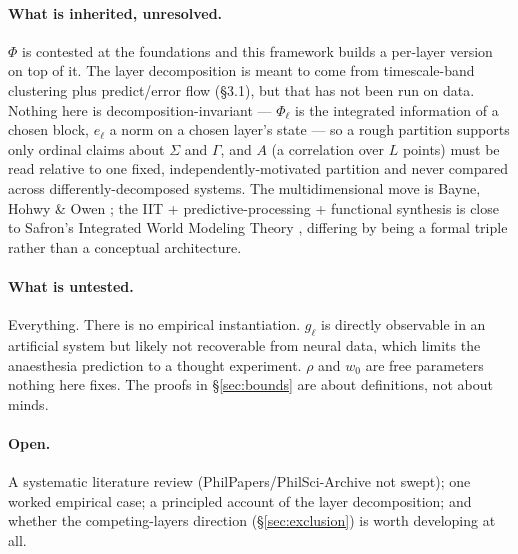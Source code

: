 \documentclass[11pt]{article}
\begin{document}
\paragraph{What is inherited, unresolved.} $\Phi$ is contested at the foundations \cite{barrett2019,hanson2023} and this framework builds a per-layer version on top of it. The layer decomposition is meant to come from timescale-band clustering plus predict/error flow (\S3.1), but that has not been run on data. Nothing here is decomposition-invariant --- $\Phi_\ell$ is the integrated information of a chosen block, $e_\ell$ a norm on a chosen layer's state --- so a rough partition supports only ordinal claims about $\Sigma$ and $\Gamma$, and $A$ (a correlation over $L$ points) must be read relative to one fixed, independently-motivated partition and never compared across differently-decomposed systems. The multidimensional move is Bayne, Hohwy \& Owen \cite{bayne2016}; the IIT + predictive-processing + functional synthesis is close to Safron's Integrated World Modeling Theory \cite{safron2020}, differing by being a formal triple rather than a conceptual architecture.

\paragraph{What is untested.} Everything. There is no empirical instantiation. $g_\ell$ is directly observable in an artificial system but likely not recoverable from neural data, which limits the anaesthesia prediction to a thought experiment. $\rho$ and $w_0$ are free parameters nothing here fixes. The proofs in \S\ref{sec:bounds} are about definitions, not about minds.

\paragraph{Open.} A systematic literature review (PhilPapers/PhilSci-Archive not swept); one worked empirical case; a principled account of the layer decomposition; and whether the competing-layers direction (\S\ref{sec:exclusion}) is worth developing at all.
\end{document}
